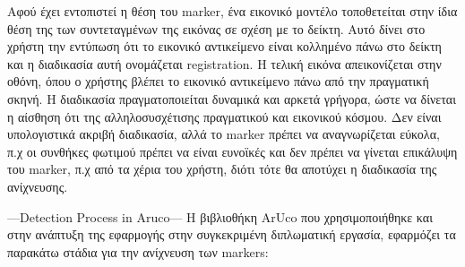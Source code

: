 Αφού έχει εντοπιστεί η θέση του marker, ένα εικονικό μοντέλο τοποθετείται στην ίδια θέση της των συντεταγμένων της εικόνας σε σχέση με το δείκτη. Αυτό δίνει στο χρήστη την εντύπωση ότι το εικονικό αντικείμενο είναι κολλημένο πάνω στο δείκτη και η διαδικασία αυτή ονομάζεται registration. Η τελική εικόνα απεικονίζεται στην οθόνη, όπου ο χρήστης βλέπει το εικονικό αντικείμενο πάνω από την πραγματική σκηνή. Η διαδικασία πραγματοποιείται δυναμικά και αρκετά γρήγορα, ώστε να δίνεται η αίσθηση ότι της αλληλοσυσχέτισης πραγματικού και εικονικού κόσμου. Δεν είναι υπολογιστικά ακριβή διαδικασία, αλλά το marker πρέπει να αναγνωρίζεται εύκολα, π.χ οι συνθήκες φωτιμού πρέπει να είναι ευνοϊκές και δεν πρέπει να γίνεται επικάλυψη του marker, π.χ από τα χέρια του χρήστη, διότι τότε θα αποτύχει η διαδικασία της ανίχνευσης. 





---Detection Process in Aruco---
Η βιβλιοθήκη ArUco που χρησιμοποιήθηκε και στην ανάπτυξη της εφαρμογής στην συγκεκριμένη διπλωματική εργασία, εφαρμόζει τα παρακάτω στάδια για την ανίχνευση των markers:


